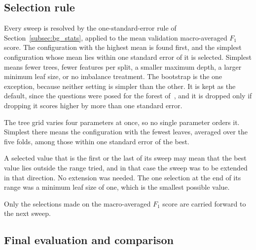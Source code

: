 \documentclass[conference,10pt]{IEEEtran}
\begin{document}
\subsection{Selection rule}
\label{subsec:emp_selection}

Every sweep is resolved by the one-standard-error rule of
Section~\ref{subsec:bg_stats}, applied to the mean validation
macro-averaged $F_1$ score. The configuration with the highest mean is
found first, and the simplest configuration whose mean lies within one
standard error of it is selected. Simplest means fewer trees, fewer
features per split, a smaller maximum depth, a larger minimum leaf size, or
no imbalance treatment. The bootstrap is the one exception, because neither setting is simpler than
the other. It is kept as the default, since the questions were posed for the
forest of~\cite{breiman2001random}, and it is dropped only if dropping it
scores higher by more than one standard error.

The tree grid varies four parameters at once, so no single parameter orders
it. Simplest there means the configuration with the fewest leaves, averaged
over the five folds, among those within one standard error of the best.

A selected value that is the first or the last of its sweep may mean that
the best value lies outside the range tried, and in that case the sweep was
to be extended in that direction. No extension was needed. The one
selection at the end of its range was a minimum leaf size of one, which is
the smallest possible value.

Only the selections made on the
macro-averaged $F_1$ score are carried forward to the next sweep.

\subsection{Final evaluation and comparison}
\label{subsec:emp_final}
\end{document}
